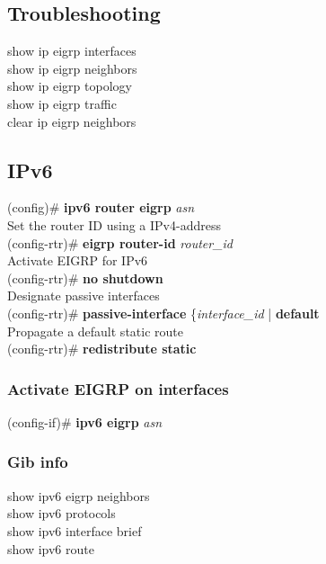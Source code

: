 \subsection{Troubleshooting}
show ip eigrp interfaces\\
show ip eigrp neighbors\\
show ip eigrp topology\\
show ip eigrp traffic\\
clear ip eigrp neighbors
\subsection{IPv6}
(config)\# \textbf{ipv6 router eigrp} \textit{asn}\vspace{11pt}\\
\textrm{Set the router ID using a IPv4-address}\\
(config-rtr)\# \textbf{eigrp router-id} \textit{router\_id}\vspace{11pt}\\
\textrm{Activate EIGRP for IPv6}\\
(config-rtr)\# \textbf{no shutdown}\vspace{11pt}\\
\textrm{Designate passive interfaces}\\
(config-rtr)\# \textbf{passive-interface} \{\textit{interface\_id} | \textbf{default}\vspace{11pt}\\
\textrm{Propagate a default static route}\\
(config-rtr)\# \textbf{redistribute static}
\subsubsection*{Activate EIGRP on interfaces}
(config-if)\# \textbf{ipv6 eigrp} \textit{asn}
\subsubsection*{Gib info}
show ipv6 eigrp neighbors\\
show ipv6 protocols\\
show ipv6 interface brief\\
show ipv6 route